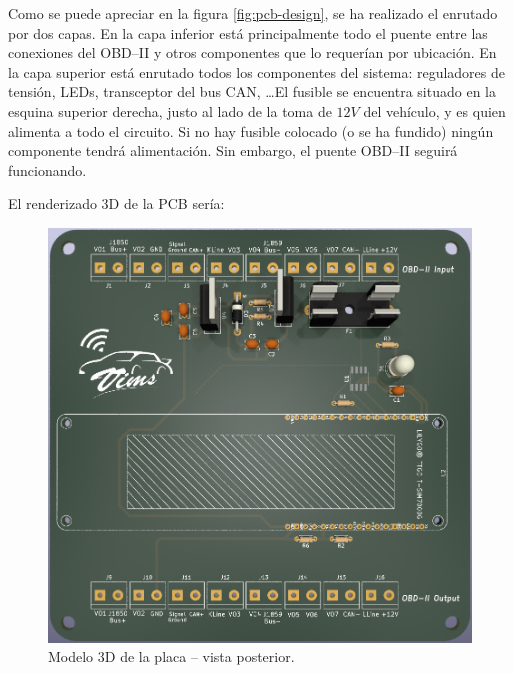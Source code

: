 Como se puede apreciar en la figura \ref{fig:pcb-design}, se ha realizado el enrutado
por dos capas. En la capa inferior está principalmente todo el puente entre las
conexiones del \ac{OBD}--II y otros componentes que lo requerían por ubicación. En
la capa superior está enrutado todos los componentes del sistema: reguladores de
tensión, LEDs, transceptor del bus \ac{CAN}, \dots El fusible se encuentra situado
en la esquina superior derecha, justo al lado de la toma de $12V$ del vehículo,
y es quien alimenta a todo el circuito. Si no hay fusible colocado (o se ha fundido)
ningún componente tendrá alimentación. Sin embargo, el puente \ac{OBD}--II seguirá
funcionando.

El renderizado 3D de la PCB sería:

\begin{figure}[H]
  \centering
  \begin{minipage}{.48\linewidth}
    \includegraphics[width=\linewidth]{images/pcb-3d-front.png}
    \caption{Modelo 3D de la placa -- vista posterior.}
    \label{fig:3d-pcb-front}
  \end{minipage}\hfill
  \begin{minipage}{.48\linewidth}

\end{minipage}
\end{figure}
